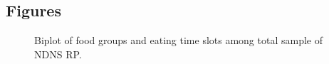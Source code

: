 \documentclass{bmcart}
\def\texttt{[image: ]}
\begin{document}
\begin{backmatter}






\section*{Figures}
  \begin{figure}[h!]
  \caption{Biplot of food groups and eating time slots among total sample of NDNS RP.}
\end{figure}


\end{backmatter}
\end{document}
